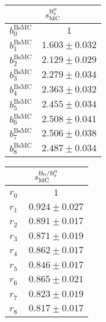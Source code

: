 \begin{table}[H]
\centering
\begin{multicols}{3}

\begin{tabular}{cc}
\toprule 
\multicolumn{2}{c}{$s_{\text{MC}}^{\text{B}{}_{\text{s}}^{\text{0}}}$} \\ \midrule
$ b_0^{\text{BsMC}} $&$   1                  $\\
$ b_1^{\text{BsMC}} $&$   1.603 \pm 0.032    $\\
$ b_2^{\text{BsMC}} $&$   2.129 \pm 0.029    $\\
$ b_3^{\text{BsMC}} $&$   2.279 \pm 0.034    $\\
$ b_4^{\text{BsMC}} $&$   2.363 \pm 0.032    $\\
$ b_5^{\text{BsMC}} $&$   2.455 \pm 0.034    $\\
$ b_6^{\text{BsMC}} $&$   2.508 \pm 0.041    $\\
$ b_7^{\text{BsMC}} $&$   2.506 \pm 0.038    $\\
$ b_8^{\text{BsMC}} $&$   2.487 \pm 0.034    $\\
\bottomrule
\end{tabular}

\begin{tabular}{cc}
\toprule 
\multicolumn{2}{c}{$s_{\text{MC}}^{\mathrm{B_0}/\text{B}{}_{\text{s}}^{\text{0}}}$} \\ \midrule
$ r_0^{\phantom{B}} $&$   1                  $\\
$ r_1^{\phantom{B}} $&$   0.924 \pm 0.027    $\\
$ r_2^{\phantom{B}} $&$   0.891 \pm 0.017    $\\
$ r_3^{\phantom{B}} $&$   0.871 \pm 0.019    $\\
$ r_4^{\phantom{B}} $&$   0.862 \pm 0.017    $\\
$ r_5^{\phantom{B}} $&$   0.846 \pm 0.017    $\\
$ r_6^{\phantom{B}} $&$   0.865 \pm 0.021    $\\
$ r_7^{\phantom{B}} $&$   0.823 \pm 0.019    $\\
$ r_8^{\phantom{B}} $&$   0.817 \pm 0.017    $\\
\bottomrule
\end{tabular}


\end{multicols}
\end{table}
